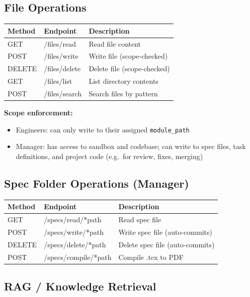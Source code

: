 \documentclass[11pt,a4paper]{article}
\begin{document}
\subsection{File Operations}

\begin{longtable}{p{2.5cm} p{5cm} p{6cm}}
\toprule
\textbf{Method} & \textbf{Endpoint} & \textbf{Description} \\
\midrule
\endhead
GET    & /files/read                & Read file content \\
POST   & /files/write               & Write file (scope-checked) \\
DELETE & /files/delete              & Delete file (scope-checked) \\
GET    & /files/list                & List directory contents \\
POST   & /files/search              & Search files by pattern \\
\bottomrule
\end{longtable}

\textbf{Scope enforcement:}
\begin{itemize}
  \item Engineers: can only write to their assigned \texttt{module\_path}
  \item Manager: has access to sandbox and codebase; can write to spec files, task definitions, and project code (e.g.\ for review, fixes, merging)
\end{itemize}

\subsection{Spec Folder Operations (Manager)}

\begin{longtable}{p{2.5cm} p{5cm} p{6cm}}
\toprule
\textbf{Method} & \textbf{Endpoint} & \textbf{Description} \\
\midrule
\endhead
GET    & /specs/read/*path          & Read spec file \\
POST   & /specs/write/*path         & Write spec file (auto-commits) \\
DELETE & /specs/delete/*path        & Delete spec file (auto-commits) \\
POST   & /specs/compile/*path       & Compile .tex to PDF \\
\bottomrule
\end{longtable}

\subsection{RAG / Knowledge Retrieval}
\end{document}
